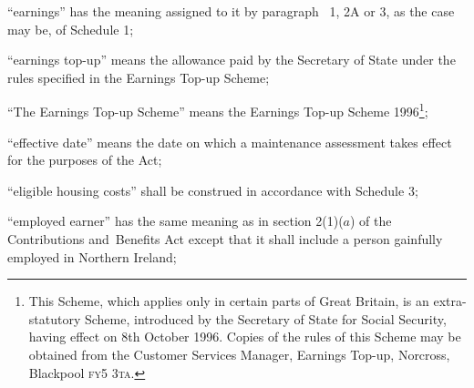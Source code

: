 \documentclass[12pt,a4paper]{article}
\begin{document}
\begin{enumerate}

“earnings” has the meaning assigned to it by paragraph~%
1, 2A or 3,  %
as the case may be, of Schedule 1;

“earnings top-up” means the allowance paid by the Secretary of State under the rules specified in the Earnings Top-up Scheme;

“The Earnings Top-up Scheme” means the Earnings Top-up Scheme 1996\footnote{\frenchspacing This Scheme, which applies only in certain parts of Great Britain, is an extra-statutory Scheme, introduced by the Secretary of State for Social Security, having effect on 8th October 1996. Copies of the rules of this Scheme may be obtained from the Customer Services Manager, Earnings Top-up, Norcross, Blackpool \textsc{fy5 3ta}.};

“effective date” means the date on which a maintenance assessment takes effect for the purposes of the Act;

“eligible housing costs” shall be construed in accordance with Schedule 3;

“employed earner” has the same meaning as in section 2(1)($a$) of the Contributions and~Benefits Act
except that it shall include a person gainfully employed in Northern Ireland;  %

%


\end{enumerate}
\end{document}
